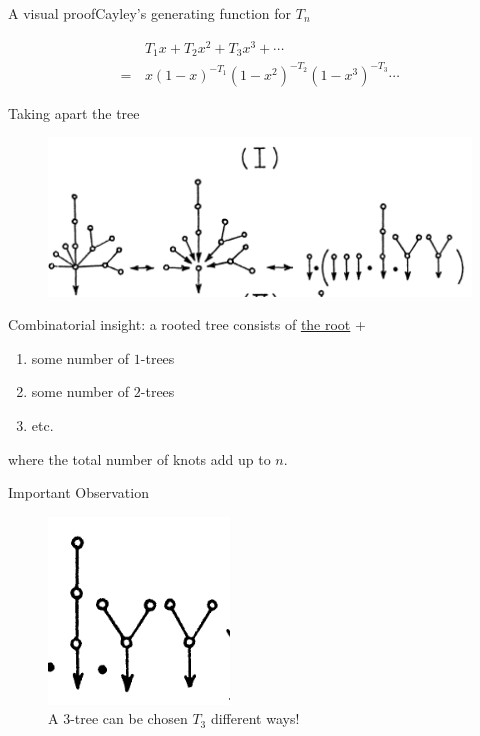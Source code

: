 \documentclass{beamer}
\begin{document}
    \begin{frame}{A visual proof}{Cayley's generating function for $T_n$}
    
    \begin{align*}
        & T_1x + T_2 x^2 + T_3 x^3 +\cdots \\
        =\,  & x(1-x)^{-T_1}(1-x^2)^{-T_2}(1-x^3)^{-T_3}\cdots
    \end{align*}
    \end{frame}

    \begin{frame}{Taking apart the tree}
        \begin{figure}
            \centering
            \includegraphics[scale=0.6]{images/tree1.png}
            \label{fig:enter-label}
        \end{figure}
    \pause
    Combinatorial insight: a rooted tree consists of \underline{the root} +  
    \begin{enumerate}
        \item some number of $1$-trees
        \item some number of $2$-trees
        \item etc.
    \end{enumerate}
    where the total number of knots add up to $n$.
    \end{frame}

    \begin{frame}{Important Observation}

        \begin{figure}
            \centering
            \includegraphics{images/tree2.png}
            \caption{A $3$-tree can be chosen $T_3$ different ways!}
            \label{fig:enter-label}
        \end{figure}
    \end{frame}
\end{document}
